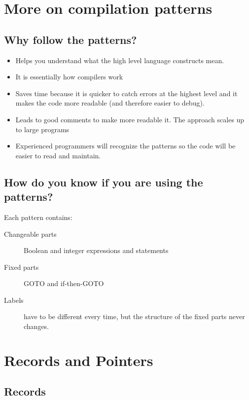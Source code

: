 \section{More on compilation patterns}\label{sec:more_on_compilation_patterns}

\subsection{Why follow the patterns?}\label{sub:why_follow_the_patterns_}

\begin{itemize}
	\item Helps you understand what the high level language constructs mean.
	\item It is essentially how compilers work
	\item Saves time because it is quicker to catch errors at the highest level and it makes the code more readable (and therefore easier to debug).
	\item Leads to good comments to make more readable it.
	      The approach scales up to large programs
	\item Experienced programmers will recognize the patterns so the code will be easier to read and maintain.
\end{itemize}

\subsection{How do you know if you are using the patterns?}\label{sub:how_do_you_know_if_you_are_using_the_patterns_}

Each pattern contains:
\begin{description}
	\item[Changeable parts] Boolean and integer expressions and statements
	\item[Fixed parts] GOTO and if-then-GOTO
	\item[Labels] have to be different every time, but the structure of the fixed parts never changes.
\end{description}

\section{Records and Pointers}\label{sec:records_and_pointers}

\subsection{Records}\label{sub:records}

